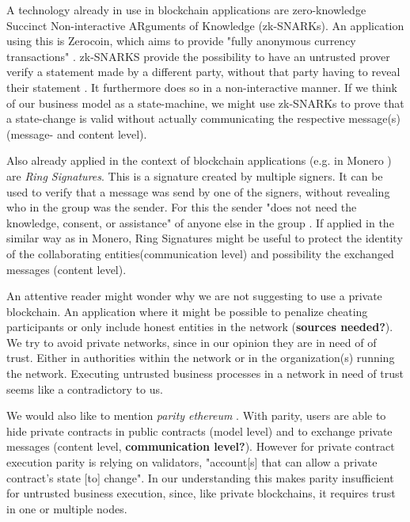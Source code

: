 \documentclass[runningheads]{llncs}
\newcommand{\comment}[1]{}
\begin{document}
\comment{
\textbf{Inefficient \textbf{SOURCE?}. Why did we not use this? -> model level}
}

A technology already in use in blockchain applications are zero-knowledge Succinct Non-interactive ARguments of Knowledge (zk-SNARKs). An application using this is Zerocoin, which aims to provide "fully anonymous currency transactions" \cite{miers2013zerocoin}. zk-SNARKS provide the possibility to have an untrusted prover verify a statement made by a different party, without that party having to reveal their statement \cite{ben2013snarks}. It furthermore does so in a non-interactive manner. If we think of our business model as a state-machine, we might use zk-SNARKs to prove that a state-change is valid without actually communicating the respective message(s) (message- and content level).

\comment{However we do not see how we could use zk-SNARKs to keep the model level secret. This might be a field of future work and if feasible, might be a better solution than the one we are providing right now.}


Also already applied in the context of blockchain applications (e.g. in Monero \cite{noether2016ring}) are \textit{Ring Signatures}. This is a signature created by multiple signers. It can be used to verify that a message was send by one of the signers, without revealing who in the group was the sender. For this the sender "does not need the knowledge, consent, or assistance" of anyone else in the group  \cite{rivest2001leak}. 
If applied in the similar way as in Monero, Ring Signatures might be useful to protect the identity of the collaborating entities(communication level) and possibility the exchanged messages (content level).  



An attentive reader might wonder why we are not suggesting to use a private blockchain. An application where it might be possible to penalize cheating participants or only include honest entities in the network (\textbf{sources needed?}). We try to avoid private networks, since in our opinion they are in need of of trust. Either in authorities within the network or in the organization(s) running the network. Executing untrusted business processes in a network in need of trust seems like a contradictory to us.


We would also like to mention \textit{parity ethereum} \cite{parity}. With parity, users are able to hide private contracts in public contracts (model level) and to exchange private messages (content level, \textbf{communication level?}). However for private contract execution parity is relying on validators, "account[s] that can allow a private contract’s state [to] change". In our understanding this makes parity insufficient for untrusted business execution, since, like private blockchains, it requires trust in one or multiple nodes. 
\end{document}
